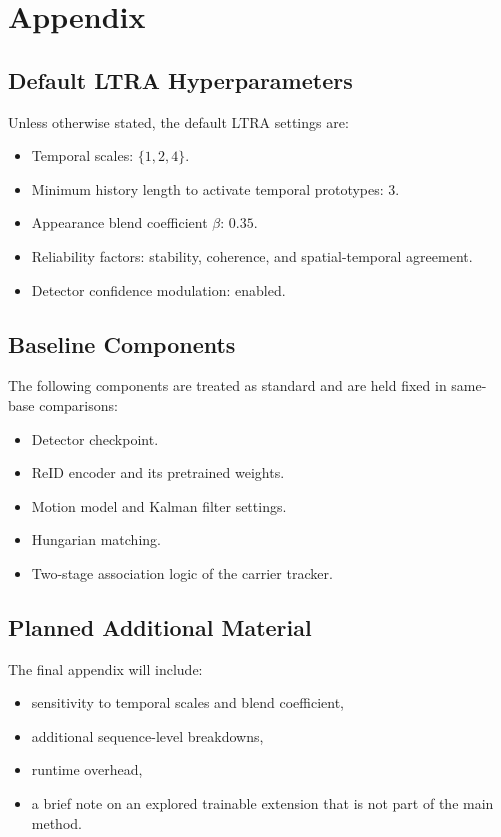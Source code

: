 \section{Appendix}
\subsection{Default LTRA Hyperparameters}
Unless otherwise stated, the default LTRA settings are:
\begin{itemize}
  \item Temporal scales: $\{1, 2, 4\}$.
  \item Minimum history length to activate temporal prototypes: $3$.
  \item Appearance blend coefficient $\beta$: $0.35$.
  \item Reliability factors: stability, coherence, and spatial-temporal agreement.
  \item Detector confidence modulation: enabled.
\end{itemize}

\subsection{Baseline Components}
The following components are treated as standard and are held fixed in same-base comparisons:
\begin{itemize}
  \item Detector checkpoint.
  \item ReID encoder and its pretrained weights.
  \item Motion model and Kalman filter settings.
  \item Hungarian matching.
  \item Two-stage association logic of the carrier tracker.
\end{itemize}

\subsection{Planned Additional Material}
The final appendix will include:
\begin{itemize}
  \item sensitivity to temporal scales and blend coefficient,
  \item additional sequence-level breakdowns,
  \item runtime overhead,
  \item a brief note on an explored trainable extension that is not part of the main method.
\end{itemize}
